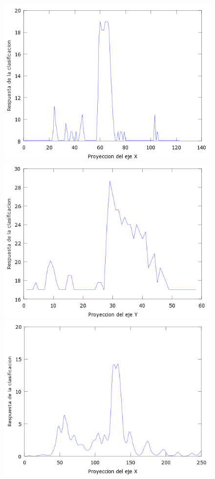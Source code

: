 \begin{figure}[H]
  \centering
  \includegraphics[scale=.4]{images/plots/boost6X}
  \includegraphics[scale=.4]{images/plots/boost6Y}
  \includegraphics[scale=.4]{images/plots/svm6X}

\end{figure}
